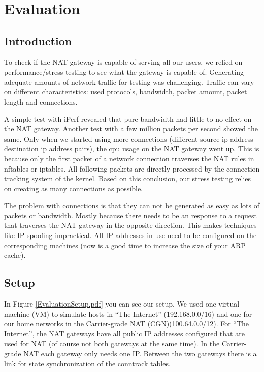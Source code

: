 \documentclass{report}
\begin{document}
\chapter{Evaluation}\label{evaluation}

\section{Introduction}\label{introduction-1}

To check if the NAT gateway is capable of serving all our users, we
relied on performance/stress testing to see what the gateway is capable
of. Generating adequate amounts of network traffic for testing was challenging.
Traffic can vary on different characteristics: used protocols, bandwidth, packet amount,
packet length and connections.

A simple test with iPerf\cite{iperf} revealed that pure bandwidth had little
to no effect on the NAT gateway. Another test with a few million
packets per second showed the same. Only when we started using more
connections (different source ip address destination ip address pairs), the cpu usage on
the NAT gateway went up. This is because only the first packet of a
network connection traverses the NAT rules in nftables or iptables. All
following packets are directly processed by the connection tracking
system of the kernel. Based on this conclusion, our stress testing relies on creating
as many connections as possible.

The problem with connections is that they can not be generated as easy as
lots of packets or bandwidth. Mostly because there needs to be an
response to a request that traverses the NAT gateway in the opposite
direction. This makes techniques like IP-spoofing impractical. All
IP addresses in use need to be configured on the corresponding machines (now is
a good time to increase the size of your ARP cache).

\section{Setup}\label{setup-1}

In Figure \ref{EvaluationSetup.pdf} you can see our setup. We used one virtual machine (VM) to simulate
hosts in ``The Internet'' (192.168.0.0/16) and one for our home networks
in the Carrier-grade NAT (CGN)(100.64.0.0/12). For ``The Internet'', the
NAT gateways have all public IP addresses configured that are used for
NAT (of course not both gateways at the same time). In the Carrier-grade
NAT each gateway only needs one IP. Between the two gateways there is a
link for state synchronization of the conntrack tables.
\end{document}
